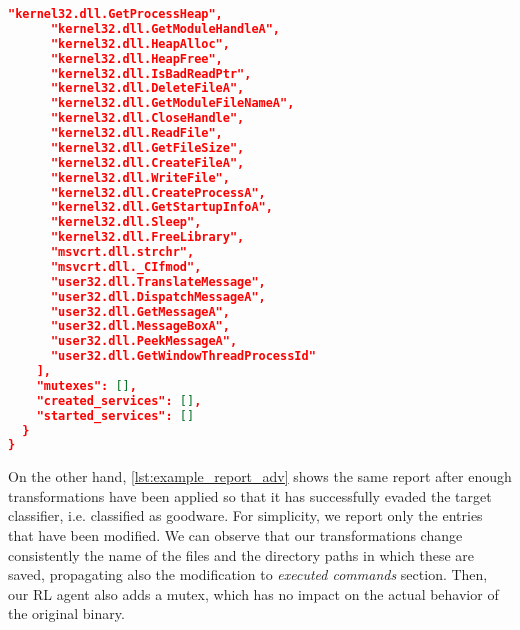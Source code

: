 \begin{lstlisting}[language=json, label=lst:example_report_or, caption=Original report entries]
      "kernel32.dll.GetProcessHeap",
      "kernel32.dll.GetModuleHandleA",
      "kernel32.dll.HeapAlloc",
      "kernel32.dll.HeapFree",
      "kernel32.dll.IsBadReadPtr",
      "kernel32.dll.DeleteFileA",
      "kernel32.dll.GetModuleFileNameA",
      "kernel32.dll.CloseHandle",
      "kernel32.dll.ReadFile",
      "kernel32.dll.GetFileSize",
      "kernel32.dll.CreateFileA",
      "kernel32.dll.WriteFile",
      "kernel32.dll.CreateProcessA",
      "kernel32.dll.GetStartupInfoA",
      "kernel32.dll.Sleep",
      "kernel32.dll.FreeLibrary",
      "msvcrt.dll.strchr",
      "msvcrt.dll._CIfmod",
      "user32.dll.TranslateMessage",
      "user32.dll.DispatchMessageA",
      "user32.dll.GetMessageA",
      "user32.dll.MessageBoxA",
      "user32.dll.PeekMessageA",
      "user32.dll.GetWindowThreadProcessId"
    ],
    "mutexes": [],
    "created_services": [],
    "started_services": []
  }
}
\end{lstlisting}

On the other hand, \autoref{lst:example_report_adv} shows the same report after enough transformations have been applied so that it has successfully evaded the target classifier, i.e. classified as goodware.
For simplicity, we report only the entries that have been modified.
We can observe that our transformations change consistently the name of the files and the directory paths in which these are saved, propagating also the modification to \textit{executed commands} section.
Then, our \gls{RL} agent also adds a mutex, which has no impact on the actual behavior of the original binary.


